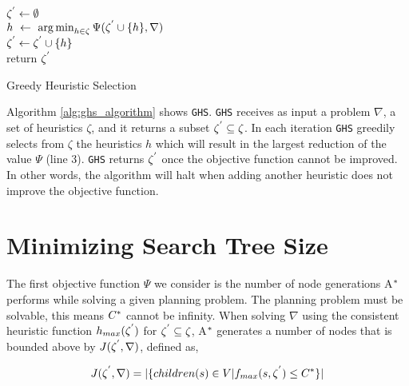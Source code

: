 \begin{algorithm}

$\zeta\sp{'} \leftarrow \emptyset$\\
 {
	$h\ \leftarrow\ \argminA_{h \in \zeta}  \Psi(\zeta\sp{'} \cup \{h\}, \nabla)$\\
	$\zeta\sp{'} \leftarrow \zeta\sp{'} \cup \{h\}$\\
} 
return $\zeta\sp{'}$
\caption{Greedy Heuristic Selection}
\label{alg:ghs_algorithm}
\end{algorithm}

Algorithm \ref{alg:ghs_algorithm} shows \texttt{GHS}. \texttt{GHS} receives as input a problem $\nabla$, a set of heuristics $\zeta$, and it returns a subset $\zeta\sp{'} \subseteq \zeta$. In each iteration \texttt{GHS} greedily selects from $\zeta$ the heuristics $h$ which will result in the largest reduction of the value $\Psi$ (line 3). \texttt{GHS} returns $\zeta\sp{'}$ once the objective function cannot be improved. In other words, the algorithm will halt when adding another heuristic does not improve the objective function.

\section{Minimizing Search Tree Size}
\noindent
The first objective function $\Psi$ we consider is the number of node generations A$\sp{*}$ performs while solving a given planning problem. The planning problem must be solvable, this means $C\sp{*}$ cannot be infinity. When solving $\nabla$ using the consistent heuristic function $h_{max}(\zeta\sp{'})$  for $\zeta\sp{'} \subseteq \zeta$, A$\sp{*}$ generates a number of nodes that is bounded above by $J(\zeta\sp{'},\nabla)$, defined as,

\begin{equation}
J(\zeta\sp{'},\nabla) = |\{children(s) \in V | f_{max}(s,\zeta\sp{'}) \leq C\sp{*}\}|
\label{eq:eq_size_search_tree_1}
\end{equation}

